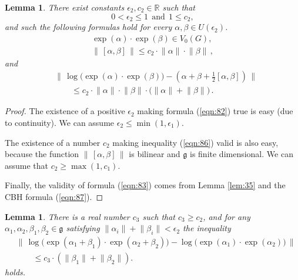 \documentclass[10pt, a4paper]{amsart}
\newtheorem{lem}[equation]{Lemma}
\theoremstyle{definition}
\numberwithin{equation}{section}
\newcommand{\opn}{\operatorname}
\newcommand{\mfrak}[1]{\mathfrak{#1}}
\newcommand{\mbb}[1]{\mathbb{#1}}
\newcommand{\smfrac}[2]{{\textstyle \frac{#1}{#2}}}
\newcommand{\norm}[1]{\lVert #1 \rVert}
\newcommand{\Norm}[1]{\bigl\lVert\, #1 \, \bigr\rVert}
\newcommand{\R}{\mbb{R}}
\newcommand{\g}{\mfrak{g}}
\begin{document}
\begin{lem} \label{lem11}
There exist constants $\epsilon_2, c_2 \in \R$ such that 
\[ 0< \epsilon_2 \leq 1 \ \ \text{and} \ \ 1 \leq c_2 , \]
and such the following formulas hold for every 
$\alpha, \beta \in U(\epsilon_2)$.
\begin{eqnarray} \label{eqn:82}
\opn{exp}(\alpha) \cdot \opn{exp}(\beta) \in V_0(G) , \\
\label{eqn:86}
\norm{\, [\alpha, \beta]\, } \leq
c_{2} \cdot \norm{\alpha} \cdot \norm{\beta} \, ,
\end{eqnarray}
and
\begin{equation} \label{eqn:83}
\begin{aligned}
& \Norm{ \opn{log} \bigl( \opn{exp}(\alpha) \cdot 
\opn{exp}(\beta) \bigr) -  
( \alpha + \beta + \smfrac{1}{2}[\alpha, \beta] ) } \\
& \qquad
\leq c_{2} \cdot \norm{\alpha} \cdot \norm{\beta} \cdot 
\bigl( \norm{\alpha} + \norm{\beta} \bigr) \, .
\end{aligned}
\end{equation}
\end{lem}

\begin{proof}
The existence of a positive $\epsilon_2$ making formula (\ref{eqn:82}) true
is easy (due to continuity). We can assume 
$\epsilon_2 \leq \min (1, \epsilon_1)$.

The existence of a number $c_2$ making inequality (\ref{eqn:86}) valid is also
easy, because the function
$\norm{\, [\alpha, \beta]\, }$ is bilinear and $\g$ is finite dimensional. 
We can assume that $c_2 \geq \max(1, c_1)$. 

Finally, the validity of formula (\ref{eqn:83}) comes from Lemma \ref{lem:35}
and the CBH formula (\ref{eqn:87}).
\end{proof}

\begin{lem} \label{lem:33}
There is a real number $c_3$ such that $c_3 \geq c_2$, and for any 
$\alpha_1, \alpha_2, \beta_1, \beta_2 \in \g$ satisfying
$\norm{\alpha_i} + \norm{\beta_i} < \epsilon_2$ the inequality 
%
\begin{equation} \label{eqn:84}
\begin{aligned}
& \Norm{ \opn{log} \bigl( \opn{exp}(\alpha_1 + \beta_1) \cdot 
\opn{exp}(\alpha_2 + \beta_2) \bigr) -  
\opn{log} \bigl( \opn{exp}(\alpha_1) \cdot 
\opn{exp}(\alpha_2) \bigr) } \\
& \qquad \leq c_{3} \cdot (\norm{\beta_1} + \norm{\beta_2} ) .
\end{aligned} 
\end{equation}
holds.
\end{lem}
\end{document}
